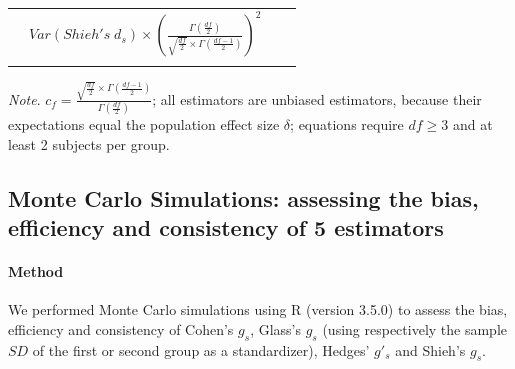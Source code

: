 \documentclass[
  man,floatsintext]{apa6}
\begin{document}
\begin{landscape}
\begin{longtable}[]{@{}lccc@{}}
\begin{minipage}[t]{0.16\columnwidth}
\end{minipage} & \begin{minipage}[t]{0.45\columnwidth}\centering
\(Var(Shieh's \; d_s) \times \left( \frac{\Gamma\left(\frac{df}{2} \right)}{\sqrt{\frac{df}{2}} \times \Gamma \left( \frac{df-1}{2}\right)}\right)^2\)\strut
\end{minipage}\tabularnewline
\begin{minipage}[t]{0.10\columnwidth}\raggedright
\strut
\end{minipage} & \begin{minipage}[t]{0.18\columnwidth}\centering
\strut
\end{minipage} & \begin{minipage}[t]{0.16\columnwidth}\centering
\strut
\end{minipage} & \begin{minipage}[t]{0.45\columnwidth}\centering
\strut
\end{minipage}\tabularnewline
\bottomrule
\end{longtable}

\emph{Note}. \(c_f=\frac{\sqrt{\frac{df}{2}} \times \Gamma\left( \frac{df-1}{2}\right)}{\Gamma\left( \frac{df}{2}\right)}\); all estimators are unbiased estimators, because their expectations equal the population effect size \(\delta\); equations require \(df \ge 3\) and at least 2 subjects per group.

\end{landscape}
\newpage

\hypertarget{monte-carlo-simulations-assessing-the-bias-efficiency-and-consistency-of-5-estimators}{%
\subsection{Monte Carlo Simulations: assessing the bias, efficiency and consistency of 5 estimators}\label{monte-carlo-simulations-assessing-the-bias-efficiency-and-consistency-of-5-estimators}}

\hypertarget{method}{%
\paragraph{Method}\label{method}}

We performed Monte Carlo simulations using R (version 3.5.0) to assess the bias, efficiency and consistency of Cohen's \(g_s\), Glass's \(g_s\) (using respectively the sample \(SD\) of the first or second group as a standardizer), Hedges' \(g'_s\) and Shieh's \(g_s\).
\end{document}

